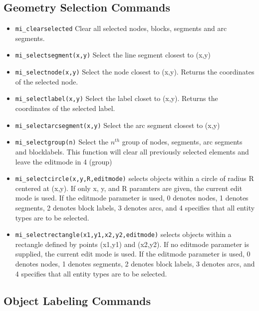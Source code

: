 \subsection{Geometry Selection Commands}

\begin{itemize}
\item{\tt mi\_clearselected} Clear all selected nodes, blocks, segments
and arc segments.

\item{\tt mi\_selectsegment(x,y)} Select the line segment closest to
(x,y)

\item{\tt mi\_selectnode(x,y)} Select the node closest to (x,y).
Returns the coordinates of the selected node.

\item{\tt mi\_selectlabel(x,y)} Select the label closet to (x,y).
Returns the coordinates of the selected label.

\item{\tt mi\_selectarcsegment(x,y)} Select the arc segment closest to
(x,y)

\item{\tt mi\_selectgroup(n)} Select the $n^{th}$ group of nodes, segments, arc
segments and blocklabels. This function will clear all previously selected
elements and leave the editmode in 4 (group)

\item{\tt mi\_selectcircle(x,y,R,editmode)} selects objects within a circle of radius
R centered at (x,y).  If only x, y, and R paramters are given, the current
edit mode is used.  If the editmode parameter is used, 0 denotes nodes, 1 denotes segments,
2 denotes block labels, 3 denotes arcs, and 4 specifies that all entity types are to be selected.

\item{\tt mi\_selectrectangle(x1,y1,x2,y2,editmode)} selects objects within a rectangle
defined by points (x1,y1) and (x2,y2). If no editmode parameter is supplied,
the current edit mode is used.  If the editmode parameter is used, 0 denotes nodes, 1 denotes segments,
2 denotes block labels, 3 denotes arcs, and 4 specifies that all entity types are to be selected.

\end{itemize}

\subsection{Object Labeling Commands}

